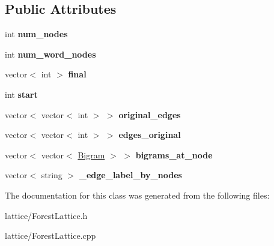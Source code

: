 \subsection*{Public Attributes}
\begin{DoxyCompactItemize}
\item 
\hypertarget{class_forest_lattice_a3c194341d2a88457604e0042534358fc}{
int {\bfseries num\_\-nodes}}
\label{class_forest_lattice_a3c194341d2a88457604e0042534358fc}

\item 
\hypertarget{class_forest_lattice_af7ac8b02750f52523a49b5b810e36601}{
int {\bfseries num\_\-word\_\-nodes}}
\label{class_forest_lattice_af7ac8b02750f52523a49b5b810e36601}

\item 
\hypertarget{class_forest_lattice_ab0e2ec92e11ab7d77e33c109f2451d7d}{
vector$<$ int $>$ {\bfseries final}}
\label{class_forest_lattice_ab0e2ec92e11ab7d77e33c109f2451d7d}

\item 
\hypertarget{class_forest_lattice_a95785401e57ddbcc516116f59391a7cd}{
int {\bfseries start}}
\label{class_forest_lattice_a95785401e57ddbcc516116f59391a7cd}

\item 
\hypertarget{class_forest_lattice_a2a0ccc16eaa3f83ae395c825c8bcf583}{
vector$<$ vector$<$ int $>$ $>$ {\bfseries original\_\-edges}}
\label{class_forest_lattice_a2a0ccc16eaa3f83ae395c825c8bcf583}

\item 
\hypertarget{class_forest_lattice_af55e45f3503fafeb79ef53d25abfc78b}{
vector$<$ vector$<$ int $>$ $>$ {\bfseries edges\_\-original}}
\label{class_forest_lattice_af55e45f3503fafeb79ef53d25abfc78b}

\item 
\hypertarget{class_forest_lattice_ac38a1f457fae9f29fab0b922dd8b5b81}{
vector$<$ vector$<$ \hyperlink{struct_bigram}{Bigram} $>$ $>$ {\bfseries bigrams\_\-at\_\-node}}
\label{class_forest_lattice_ac38a1f457fae9f29fab0b922dd8b5b81}

\item 
\hypertarget{class_forest_lattice_a80b60a05f3f81f4291b1989baf240cf8}{
vector$<$ string $>$ {\bfseries \_\-edge\_\-label\_\-by\_\-nodes}}
\label{class_forest_lattice_a80b60a05f3f81f4291b1989baf240cf8}

\end{DoxyCompactItemize}


The documentation for this class was generated from the following files:\begin{DoxyCompactItemize}
\item 
lattice/ForestLattice.h\item 
lattice/ForestLattice.cpp\end{DoxyCompactItemize}
